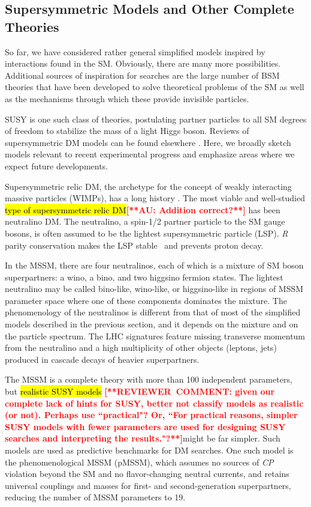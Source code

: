 \documentclass{ar-1col}
\newcommand{\IP}{invisible particle}
\begin{document}
\subsection{Supersymmetric Models and Other Complete Theories}\label{sec:SUSYModels}

So far, we have considered rather general simplified models
inspired by interactions found in the SM. Obviously, there are many more possibilities. Additional sources of inspiration for
searches are the large number of BSM theories that have been
developed to solve theoretical problems of the SM as well as the
mechanisms through which these provide {\IP}s.

SUSY is one such class of theories, postulating
partner particles to all SM degrees of freedom to stabilize the
mass of a light Higgs boson. Reviews of supersymmetric DM models
can be found elsewhere \cite{Feng:2010gw}. Here, we broadly
sketch models relevant to recent experimental progress and emphasize areas
where we expect future developments.

Supersymmetric relic DM, the archetype for the concept of weakly interacting massive particles (WIMPs),
has a long history \cite{1984NuPhB.238..453E}. The most
viable and well-studied \hl{type of supersymmetric relic DM}\textbf{\textcolor{red}{[**AU: Addition correct?**]}} has been neutralino DM. The
neutralino, a spin-1/2 partner particle to the SM gauge bosons, is
often assumed to be the lightest supersymmetric particle (LSP).
\textit{R} parity conservation makes the LSP stable~\cite{Farrar:1978xj}
and prevents proton decay.

In the MSSM, there are four neutralinos, each of which is a mixture of SM boson
superpartners: a wino, a bino, and two higgsino fermion states.
The lightest neutralino may be called bino-like, wino-like, or
higgsino-like in regions of MSSM parameter space where one of
these components dominates the mixture. The phenomenology of the neutralinos is different from that of most of the simplified models described in the previous
section, and it depends on the mixture and on the particle spectrum.
The LHC signatures feature missing transverse momentum from the
neutralino and a high multiplicity of other objects (leptons,
jets) produced in cascade decays of heavier superpartners.

The MSSM is a complete theory with more than 100 independent
parameters, but \hl{realistic SUSY models} \textbf{\textcolor{red}{[**REVIEWER\ COMMENT: given our complete lack of hints for SUSY, better not classify models as realistic (or not).  Perhaps use ``practical"?  Or, ``For practical reasons, simpler SUSY models with fewer parameters are used for designing SUSY searches and interpreting the results."?**]}}might be far simpler. Such
models are used as predictive benchmarks for DM searches. One such model is the phenomenological MSSM (pMSSM), which assumes no
sources of \textit{CP} violation beyond the SM and no flavor-changing neutral
currents, and retains universal couplings and masses for first- and
second-generation superpartners, reducing the number of MSSM
parameters to 19.
\end{document}

